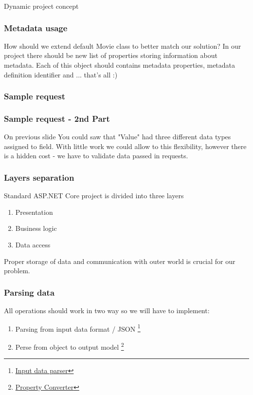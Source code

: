 \documentclass{beamer}
\begin{document}
\begin{section}{Dynamic project concept}
\begin{frame}
\end{frame}

\begin{frame}
\frametitle{Metadata usage}
How should we extend default Movie class to better match our solution? \newline \newline  In our project there should be new list of properties storing information about metadata. Each of this object should contains metadata properties, metadata definition identifier and ... that's all :)
\end{frame}

\begin{frame}
\frametitle{Sample request \footnotemark[1]}




\end{frame}

\begin{frame}
\frametitle{Sample request - 2nd Part }
On previous slide You could saw that "Value"  had three different data types assigned to field. With little work we could allow to this flexibility, however there is a hidden cost - we have to validate data passed in requests.

\end{frame}

\begin{frame}
\frametitle{Layers separation} 
Standard ASP.NET Core project is divided into three layers
\begin{enumerate}
	\item Presentation
	\item Business logic
	\item Data access
\end{enumerate}

Proper storage of data and communication with outer world is crucial for our problem.
\end{frame}

\begin{frame}
\frametitle{Parsing data}

All operations should work in two way so we will have to implement:
\begin{enumerate}
\item Parsing from input data format / JSON \footnote[1]{\href{https://github.com/paqaos/DynamicMetadata-SFI2021/blob/main/MovieDatabase/MovieDatabase/Services/MetadataObject/InputDataParser.cs}{Input data parser}}
\item Perse from object to output model \footnote[2]{\href{https://github.com/paqaos/DynamicMetadata-SFI2021/blob/main/MovieDatabase/MovieDatabase/Converters/PropertyConverter.cs}{Property Converter}}
\end{enumerate}
\end{frame}


\end{section}
\end{document}
